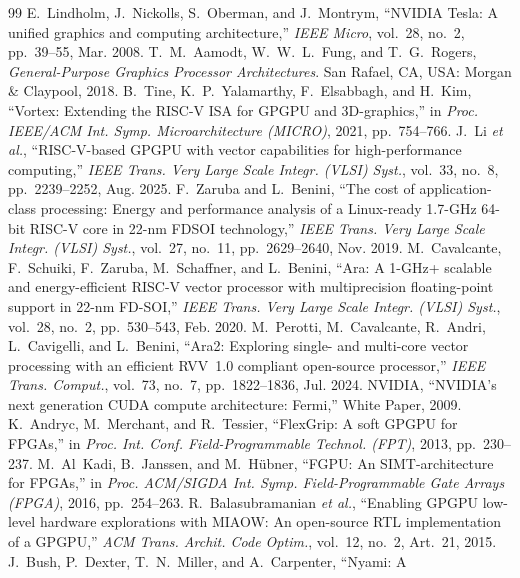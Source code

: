 \documentclass[journal]{IEEEtran}
\begin{document}
\begin{thebibliography}{99}
 E.~Lindholm, J.~Nickolls, S.~Oberman, and J.~Montrym,
``NVIDIA Tesla: A unified graphics and computing architecture,''
\emph{IEEE Micro}, vol.~28, no.~2, pp.~39--55, Mar. 2008.
 T.~M.~Aamodt, W.~W.~L.~Fung, and T.~G.~Rogers,
\emph{General-Purpose Graphics Processor Architectures}. San Rafael, CA, USA:
Morgan \& Claypool, 2018.
 B.~Tine, K.~P.~Yalamarthy, F.~Elsabbagh, and H.~Kim,
``Vortex: Extending the RISC-V ISA for GPGPU and 3D-graphics,'' in
\emph{Proc. IEEE/ACM Int. Symp. Microarchitecture (MICRO)}, 2021, pp.~754--766.
 J.~Li \emph{et al.}, ``RISC-V-based GPGPU with vector
capabilities for high-performance computing,'' \emph{IEEE Trans. Very Large Scale
Integr. (VLSI) Syst.}, vol.~33, no.~8, pp.~2239--2252, Aug. 2025.
 F.~Zaruba and L.~Benini, ``The cost of application-class processing:
Energy and performance analysis of a Linux-ready 1.7-GHz 64-bit RISC-V core in 22-nm
FDSOI technology,'' \emph{IEEE Trans. Very Large Scale Integr. (VLSI) Syst.},
vol.~27, no.~11, pp.~2629--2640, Nov. 2019.
 M.~Cavalcante, F.~Schuiki, F.~Zaruba, M.~Schaffner, and L.~Benini,
``Ara: A 1-GHz+ scalable and energy-efficient RISC-V vector processor with
multiprecision floating-point support in 22-nm FD-SOI,'' \emph{IEEE Trans. Very Large
Scale Integr. (VLSI) Syst.}, vol.~28, no.~2, pp.~530--543, Feb. 2020.
 M.~Perotti, M.~Cavalcante, R.~Andri, L.~Cavigelli, and L.~Benini,
``Ara2: Exploring single- and multi-core vector processing with an efficient RVV~1.0
compliant open-source processor,'' \emph{IEEE Trans. Comput.}, vol.~73, no.~7,
pp.~1822--1836, Jul. 2024.
 NVIDIA, ``NVIDIA's next generation CUDA compute architecture:
Fermi,'' White Paper, 2009.
 K.~Andryc, M.~Merchant, and R.~Tessier, ``FlexGrip: A soft
GPGPU for FPGAs,'' in \emph{Proc. Int. Conf. Field-Programmable Technol. (FPT)},
2013, pp.~230--237.
 M.~Al~Kadi, B.~Janssen, and M.~H\"ubner, ``FGPU: An
SIMT-architecture for FPGAs,'' in \emph{Proc. ACM/SIGDA Int. Symp.
Field-Programmable Gate Arrays (FPGA)}, 2016, pp.~254--263.
 R.~Balasubramanian \emph{et al.}, ``Enabling GPGPU low-level
hardware explorations with MIAOW: An open-source RTL implementation of a GPGPU,''
\emph{ACM Trans. Archit. Code Optim.}, vol.~12, no.~2, Art.~21, 2015.
 J.~Bush, P.~Dexter, T.~N.~Miller, and A.~Carpenter, ``Nyami: A

\end{thebibliography}
\end{document}
